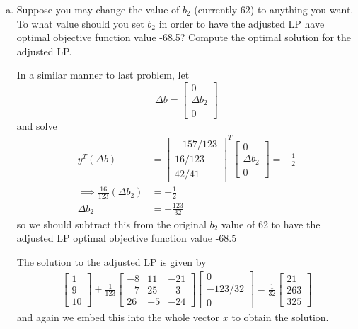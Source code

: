 \documentclass{article}
\begin{document}
\begin{enumerate}
\begin{enumerate}[a)]
\begin{soln}
				\end{soln}

			\item Suppose you may change the value of $b_2$ (currently 62) to anything you want. To what value should you set $b_2$ in order to have the adjusted LP have optimal objective function value -68.5? Compute the optimal solution for the adjusted LP.
				\begin{soln}
					In a similar manner to last problem, let \[\Delta b = \begin{bmatrix}
							0 \\ \Delta b_2 \\ 0
					\end{bmatrix}\] and solve 
					\begin{align*}
						y^T (\Delta b) &= \begin{bmatrix}
							-157/123 \\ 16/123 \\ 42/41
						\end{bmatrix}^T \begin{bmatrix}
							0 \\ \Delta b_2 \\ 0
						\end{bmatrix} = -\frac{1}{2} \\
						\implies \frac{16}{123}(\Delta b_2) &= -\frac{1}{2} \\
						\Delta b_2 &= -\frac{123}{32}
					\end{align*} so we should subtract this from the original $b_2$ value of 62 to have the adjusted LP optimal objective function value -68.5

					The solution to the adjusted LP is given by
					\begin{align*}
						\begin{bmatrix}
							1 \\ 9 \\ 10
						\end{bmatrix} + \frac{1}{123}\begin{bmatrix}
							-8 & 11 & -21 \\
							-7 & 25 & -3 \\
							26 & -5 & -24
						\end{bmatrix}\begin{bmatrix}
							0 \\ -123/32 \\ 0
						\end{bmatrix} = \frac{1}{32}\begin{bmatrix}
							21 \\ 263 \\ 325
						\end{bmatrix}
					\end{align*}
					and again we embed this into the whole vector $x$ to obtain the solution.
					

\end{soln}
\end{enumerate}
\end{enumerate}
\end{document}
